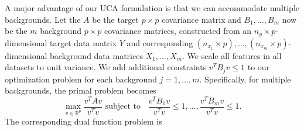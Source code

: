 \documentclass[12pt]{article}
\begin{document}


A major advantage of our UCA formulation is that we can accommodate multiple backgrounds. Let the $A$ be the target $p \times p$ covariance matrix and $ B_1, \ldots, B_m$ now be the $m$ background $p \times p$ covariance matrices, constructed from an $n_y \times p$-dimensional target data matrix $Y$ and corresponding $(n_{x_1} \times p), \ldots, (n_{x_m}\times p)$-dimensional background data matrices $X_1, \ldots, X_m$. We scale all features in all datasets to unit variance.
We add additional constraints $ v^TB_jv\leq 1$ to our optimization problem for each background $j = 1, \ldots, m$. Specifically, for multiple backgrounds, the primal problem becomes
\begin{equation}
  \label{eq:4}
  \max_{v\in \mathbb{R}^p}{\frac{v^TAv}{v^T v}} \text{ subject to }\; \; \frac{v^TB_1 v}{v^T v} \leq 1, \ldots, \frac{v^T B_m v}{v^T v}\leq 1.
\end{equation}
The corresponding dual function problem is
\end{document}
